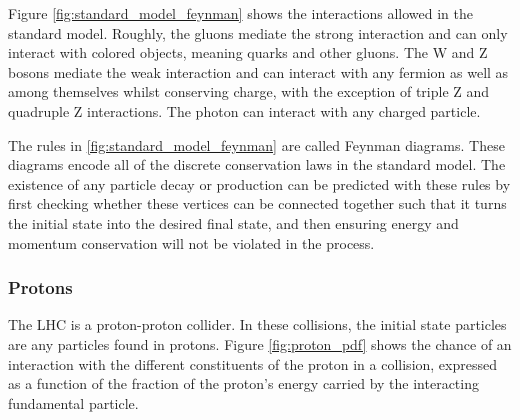   Figure \ref{fig:standard_model_feynman} shows the interactions allowed in the standard model. Roughly, the gluons mediate the strong interaction and can only interact with colored objects, meaning quarks and other gluons. The W and Z bosons mediate the weak interaction and can interact with any fermion as well as among themselves whilst conserving charge, with the exception of triple Z and quadruple Z interactions. The photon can interact with any charged particle.

  The rules in \ref{fig:standard_model_feynman} are called Feynman diagrams. These diagrams encode all of the discrete conservation laws in the standard model. The existence of any particle decay or production can be predicted with these rules by first checking whether these vertices can be connected together such that it turns the initial state into the desired final state, and then ensuring energy and momentum conservation will not be violated in the process.


  \subsubsection{Protons}
    The LHC is a proton-proton collider. In these collisions, the initial state particles are any particles found in protons. Figure \ref{fig:proton_pdf} shows the chance of an interaction with the different constituents of the proton in a collision, expressed as a function of the fraction of the proton's energy carried by the interacting fundamental particle.

